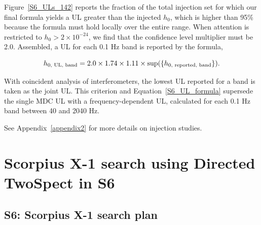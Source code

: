 Figure~\ref{S6_ULs_142} reports the fraction of the total injection set for which our final formula yields a UL greater than the injected $h_0$, which is higher than 95\% because the formula must hold locally over the entire range.
When attention is restricted to $h_0 > 2\times10^{-24}$, we find that the confidence level multiplier must be 2.0.
Assembled, a UL for each 0.1 Hz band is reported by the formula,

\begin{equation}
h_{0,\textup{ UL, band}} = 2.0 \times 1.74 \times 1.11 \times \textup{sup}(\{h_{0, \textup{ reported, band}}\}).
\label{S6_UL_formula}
\end{equation}

\noindent With coincident analysis of interferometers, the lowest UL reported for a band is taken as the joint UL.
This criterion and Equation~\ref{S6_UL_formula} supersede the single MDC UL with a frequency-dependent UL, calculated for each 0.1 Hz band between 40 and 2040 Hz.

See Appendix~\ref{appendix2} for more details on injection studies.


        \section{Scorpius X-1 search using Directed TwoSpect in S6}
        \label{directed_results}
 




\subsection{S6: Scorpius X-1 search plan}

